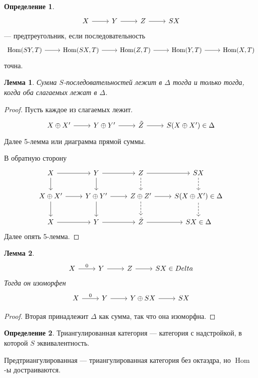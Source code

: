 \documentclass{article}
\newtheorem*{lemma}{Лемма}
\theoremstyle{definition}
\newtheorem*{definition}{Определение}
\theoremstyle{remark}
\DeclareMathOperator{\Hom}{Hom}
\newenvironment{cd}{\begin{equation*}\begin{tikzcd}}{\end{tikzcd}\end{equation*}}
\begin{document}
\begin{definition}
    \begin{cd}
        X \rar & Y \rar & Z \rar & SX
    \end{cd}
    --- предтреугольник, если последовательность
    \begin{cd}
        \Hom(SY, T) \rar & \Hom(SX, T) \rar & \Hom(Z, T) \rar & \Hom(Y, T) \rar & \Hom(X ,T)
    \end{cd}
    точна.
\end{definition}

\begin{lemma}
    Сумма $S$-последовательностей лежит в $\Delta$ тогда и только тогда, когда оба слагаемых лежат в $\Delta$.
\end{lemma}
\begin{proof}
    Пусть каждое из слагаемых лежит.
    \begin{cd}
    X \oplus X' \rar & Y \oplus Y' \rar & \tilde{Z} \rar & S(X \oplus X') \in \Delta
    \end{cd}
    Далее 5-лемма или диаграмма прямой суммы.
    
    В обратную сторону
    \begin{cd}
    X \dar \rar & Y \dar \rar & Z \dar[dashed] \rar & SX \dar[dashed] \\
    X \oplus X \dar' \rar & Y \oplus Y' \dar \rar & Z \oplus Z' \dar[dashed] \rar & S(X \oplus X') \dar[dashed] \in \Delta \\
    X \rar & Y \rar & \tilde{Z} \rar & SX \in \Delta
    \end{cd}
    Далее опять 5-лемма.
\end{proof}

\begin{lemma}
    \begin{cd}
        X \rar["0"] & Y \rar & Z \rar & SX \in Delta
    \end{cd}
    Тогда он изоморфен
    \begin{cd}
        X \rar["0"] & Y \rar & Y \oplus SX \rar & SX
    \end{cd}
\end{lemma}
\begin{proof}
    Вторая принадлежит $\Delta$ как сумма, так что она изоморфна.
\end{proof}

\begin{definition}
    Триангулированная категория --- категория с надстройкой, в которой $S$ эквивалентность.

    Предтриангулированная --- триангулированная категория без октаэдра, но $\Hom$-ы достраиваются.
\end{definition}
\end{document}
